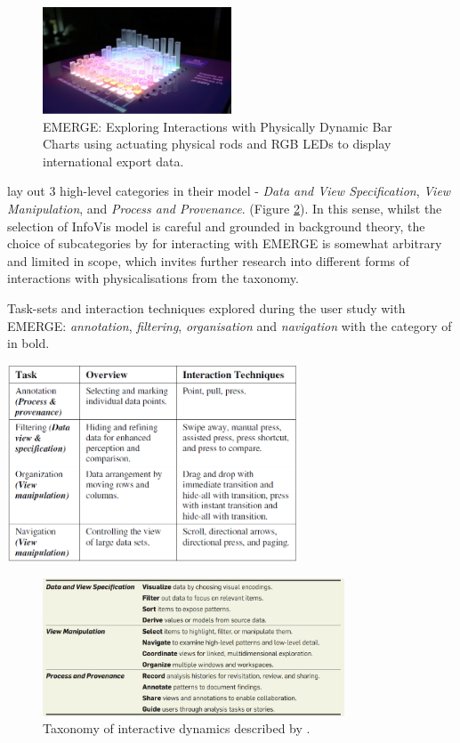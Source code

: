 \documentclass[11pt]{article}
\begin{document}
\begin{figure}[H]
\centering
\includegraphics[width=0.5\textwidth]{img/taher2015-emerge.png} 
\caption{EMERGE: Exploring Interactions with Physically Dynamic Bar Charts using actuating physical rods and RGB LEDs to display international export data.}\label{fig:taher2015-emerge}
\end{figure}

\citeauthor{heer2012} lay out 3 high-level categories in their model - \textit{Data and View Specification},
\textit{View Manipulation}, and \textit{Process and Provenance}. (Figure \ref{fig:heer2012-taxonomy}). In this sense, whilst the selection of InfoVis model is careful and grounded in background theory, the choice of subcategories by \citeauthor{taher2015} for interacting with EMERGE is somewhat arbitrary and limited in scope, which invites further research into different forms of interactions with physicalisations from the taxonomy.

\begin{table}[H]
\centering
\caption{Task-sets and interaction techniques explored during the user study with EMERGE: \textit{annotation}, \textit{filtering}, \textit{organisation} and \textit{navigation} with the category of \protect\citet{heer2012} in bold.}\label{tbl:taher2015-user-study}
\includegraphics[width=0.65\textwidth]{img/taher2015-user-study.png} 
\end{table}

\begin{figure}[H]
\centering
\includegraphics[width=0.8\textwidth]{img/heer2012-taxonomy.png} 
\caption{Taxonomy of interactive dynamics described by \protect\citet{heer2012}.}\label{fig:heer2012-taxonomy}
\end{figure}
\end{document}
